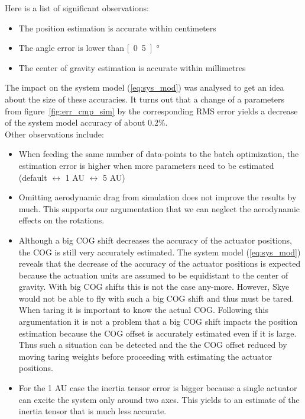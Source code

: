 Here is a list of significant observations:
\begin{itemize}
\item The position estimation is accurate within centimeters
\item The angle error is lower than \unit[0.5]{°}
\item The center of gravity estimation is accurate within millimetres
\end{itemize}
The impact on the system model (\ref{eq:sys_mod}) was analysed to get an idea about the size of these accuracies.
It turns out that a change of a parameters from figure~\ref{fig:err_cmp_sim} by the corresponding RMS error yields a decrease of the system model accuracy of about 0.2\%.\\
Other observations include:
\begin{itemize}
\item When feeding the same number of data-points to the batch optimization, the estimation error is higher when more parameters need to be estimated (default $\leftrightarrow$ 1 AU $\leftrightarrow$ 5 AU)
\item Omitting aerodynamic drag from simulation does not improve the results by much. This supports our argumentation that we can neglect the aerodynamic effects on the rotations.
\item Although a big COG shift decreases the accuracy of the actuator positions, the COG is still very accurately estimated.
The system model (\ref{eq:sys_mod}) reveals that the decrease of the accuracy of the actuator positions is expected because the actuation units are assumed to be equidistant to the center of gravity.
With big COG shifts this is not the case any-more.
However, Skye would not be able to fly with such a big COG shift and thus must be tared.
When taring it is important to know the actual COG.
Following this argumentation it is not a problem that a big COG shift impacts the position estimation because the COG offset is accurately estimated even if it is large.
Thus such a situation can be detected and the the COG offset reduced by moving taring weights before proceeding with estimating the actuator positions.
\item For the 1 AU case the inertia tensor error is bigger because a single actuator can excite the system only around two axes.
This yields to an estimate of the inertia tensor that is much less accurate.
\end{itemize}


